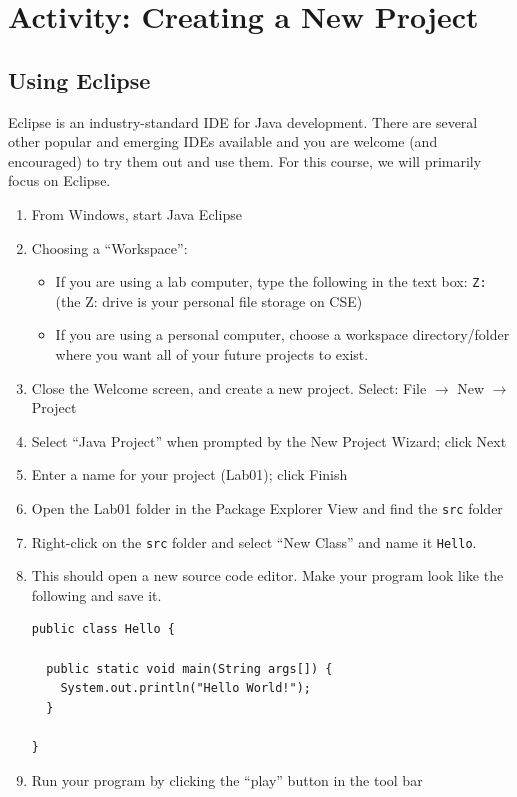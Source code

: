 \documentclass[12pt]{scrartcl}
\begin{document}
\section{Activity: Creating a New Project}

\subsection{Using Eclipse}

Eclipse is an industry-standard IDE for Java development.  
There are several other popular and emerging IDEs available 
and you are welcome (and encouraged) to try them out and use 
them.  For this course, we will primarily focus on Eclipse.

\begin{enumerate}
  \item From Windows, start Java Eclipse
  \item Choosing a ``Workspace'':
  \begin{itemize}
    \item If you are using a lab computer, type the following in the 
    text box: \texttt{Z:\Workspace} (the Z: drive is your 
    personal file storage on CSE)
	\item If you are using a personal computer, choose a workspace 
	directory/folder where you want all of your future projects to 
	exist.
  \end{itemize}
  \item Close the Welcome screen, and create a new project.  
    Select:  File $\rightarrow$ New $\rightarrow$ Project
  \item Select ``Java Project'' when prompted by the New Project Wizard; click Next
  \item Enter a name for your project (Lab01); click Finish
  \item Open the Lab01 folder in the Package Explorer View and find the \texttt{src} folder
  \item Right-click on the \texttt{src} folder and select ``New Class'' and name it \texttt{Hello}.
  \item This should open a new source code editor.  Make your program
  look like the following and save it.
\begin{verbatim}
public class Hello {

  public static void main(String args[]) {
    System.out.println("Hello World!");
  }

}
\end{verbatim}
  \item Run your program by clicking the ``play'' button in the tool bar
\end{enumerate}
\end{document}
